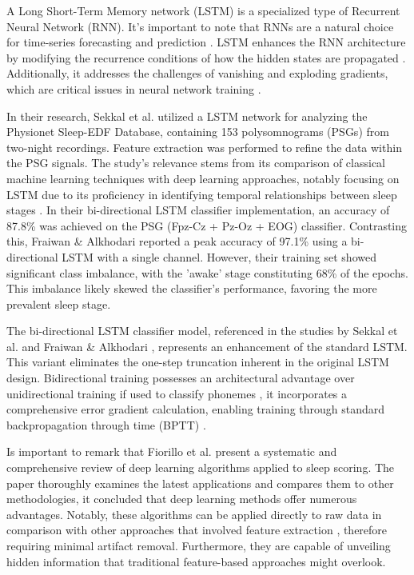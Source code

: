 \documentclass{article}
\begin{document}
A Long Short-Term Memory network (LSTM) is a specialized type of Recurrent Neural Network (RNN). It's important to note that RNNs are a natural choice for time-series forecasting and prediction \cite{Aggarwal2018}. LSTM enhances the RNN architecture by modifying the recurrence conditions of how the hidden states are propagated \cite{Aggarwal2018}. Additionally, it addresses the challenges of vanishing and exploding gradients, which are critical issues in neural network training \cite{Aggarwal2018, michielli2019}.

In their research, Sekkal et al. \cite{Sekkal2022} utilized a LSTM network for analyzing the Physionet Sleep-EDF Database, containing 153 polysomnograms (PSGs) from two-night recordings. Feature extraction was performed to refine the data within the PSG signals. The study's relevance stems from its comparison of classical machine learning techniques with deep learning approaches, notably focusing on LSTM due to its proficiency in identifying temporal relationships between sleep stages \cite{Sekkal2022}. In their bi-directional LSTM classifier implementation, an accuracy of 87.8\% was achieved on the PSG (Fpz-Cz + Pz-Oz + EOG) classifier. Contrasting this, Fraiwan \& Alkhodari \cite{fraiwan2020} reported a peak accuracy of 97.1\% using a bi-directional LSTM with a single channel. However, their training set showed significant class imbalance, with the 'awake' stage constituting 68\% of the epochs. This imbalance likely skewed the classifier's performance, favoring the more prevalent sleep stage.

The bi-directional LSTM classifier model, referenced in the studies by Sekkal et al. \cite{Sekkal2022} and Fraiwan \& Alkhodari \cite{fraiwan2020}, represents an enhancement of the standard LSTM. This variant eliminates the one-step truncation inherent in the original LSTM design. Bidirectional training possesses an architectural advantage over unidirectional training if used
to classify phonemes \cite{Graves2005}, it incorporates a comprehensive error gradient calculation, enabling training through standard backpropagation through time (BPTT) \cite{Staudemeyer2019}.

Is important to remark that Fiorillo et al. \cite{Fiorillo2019} present a systematic and comprehensive review of deep learning algorithms applied to sleep scoring. The paper thoroughly examines the latest applications and compares them to other methodologies, it concluded that deep learning methods offer numerous advantages. Notably, these algorithms can be applied directly to raw data in comparison with other approaches that involved feature extraction \cite{Stuburic2020} \cite{michielli2019}, therefore requiring minimal artifact removal. Furthermore, they are capable of unveiling hidden information that traditional feature-based approaches might overlook.
\end{document}
